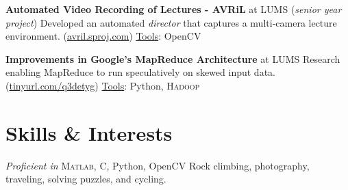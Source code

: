 \documentclass[10pt,twoside,a4paper]{article}
\newif\ifdetail
\newcommand\CPP{C\nolinebreak[4]\hspace{-.05em}\raisebox{.4ex}{\relsize{-3}{\textbf{++}}}}
\begin{document}
\textbf{Automated Video Recording of Lectures - AVRiL} at LUMS (\textit{senior year project}) \newline
Developed an automated \textit{director} that captures a multi-camera lecture environment. %
(\href{http://avril.sproj.com}{avril.sproj.com}) \underline{Tools}: OpenCV%

\textbf{Improvements in Google's MapReduce Architecture} at LUMS \newline
Research enabling MapReduce to run speculatively on skewed input data. (\href{https://code.google.com/p/mrplus/}{tinyurl.com/q3detyg}) \underline{Tools}: Python, \textsc{Hadoop}

\ifdetail
\textbf{Surveillance Video Compression through Foveation} as a \textit{research initiative} \newline
Researched the development of a novel H.264 encoder which assigns more bits to areas where the human visual system is more likely to foveate in surveillance footage. (\href{http://suraj.lums.edu.pk/~foveation}{http://suraj.lums.edu.pk/\(\sim\)foveation}) \underline{Tools}: \textsc{Java} Media Framework
\fi

\section{Skills \& Interests}
\textit{Proficient in} \textsc{Matlab}, \textsc{\CPP}, Python, OpenCV \hspace{3mm}\textbar\hspace{3mm} Rock climbing, photography, traveling, solving puzzles, and cycling.

\ifdetail
\end{document}
